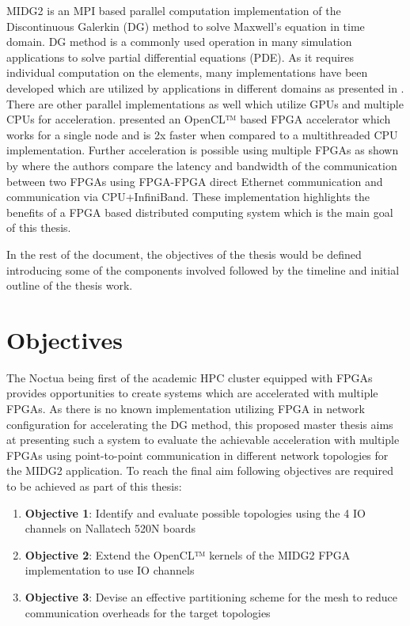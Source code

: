 \documentclass[english,notitlepage]{hgbreport}
\begin{document}
MIDG2 is an MPI based parallel computation implementation of the Discontinuous Galerkin (DG) \cite{hesthaven_nodal_2008} method
to solve Maxwell's equation in time domain. DG method is a commonly used operation in many simulation applications to solve
partial differential equations (PDE). As it requires individual computation on the elements, many implementations
have been developed which are utilized by applications in different domains as presented in \cite{ye_discontinuous_2011, wilcox_high-order_2010,
collis_discontinuous_2002}. There are other parallel implementations as well which utilize GPUs \cite{afzal_solving_2018, klockner_nodal_2009}
and multiple CPUs \cite{baggag_parallel_1999} for acceleration. \textcite{kenter_opencl-based_2018} presented an OpenCL™ based
FPGA accelerator which works for a single node and is 2x faster when compared to a multithreaded CPU implementation. Further acceleration
is possible using multiple FPGAs as shown by \textcite{kobayashi_opencl-ready_2018} where the authors compare the latency and bandwidth
of the communication between two FPGAs using FPGA-FPGA direct Ethernet communication and communication via CPU+InfiniBand.
These implementation highlights the benefits of a FPGA based distributed computing system which is the main goal of this thesis.

In the rest of the document, the objectives of the thesis would be defined introducing some of the components involved followed
by the timeline and initial outline of the thesis work.


\section{Objectives}

The Noctua being first of the academic HPC cluster equipped with FPGAs provides opportunities to 
create systems which are accelerated with multiple FPGAs. As there is no known implementation
utilizing FPGA in network configuration for accelerating the DG method, this proposed master thesis aims at presenting
such a system to evaluate the achievable acceleration with multiple FPGAs using point-to-point communication
in different network topologies for the MIDG2 application. To reach the final aim following objectives are
required to be achieved as part of this thesis:

\begin{enumerate}
	\item \textbf{Objective 1}: Identify and evaluate possible topologies using the 4 IO channels on Nallatech 520N boards
	\item \textbf{Objective 2}: Extend the OpenCL™ kernels of the MIDG2 FPGA implementation to use IO channels
	\item \textbf{Objective 3}: Devise an effective partitioning scheme for the mesh to reduce communication overheads for the target topologies
\end{enumerate}
\end{document}
